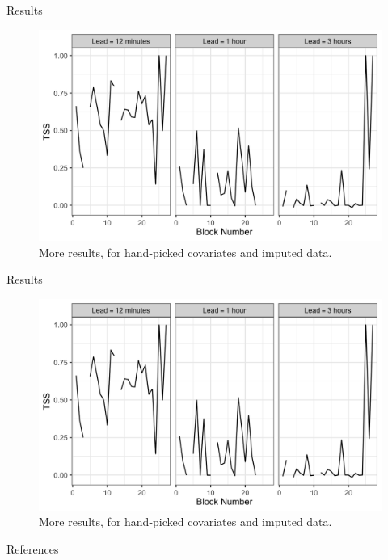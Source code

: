 \documentclass{beamer}
\begin{document}
\begin{frame}{Results}
    \begin{figure}[!htb]
        \centering
        \includegraphics[scale=0.25]{0901_results.png}
        \caption{More results, for hand-picked covariates and imputed data.}
        \label{fig:0901_results}
    \end{figure}
\end{frame}

\begin{frame}{Results}
    \begin{figure}[!htb]
        \centering
        \includegraphics[scale=0.25]{0901_results.png}
        \caption{More results, for hand-picked covariates and imputed data.}
        \label{fig:0901_results}
    \end{figure}
\end{frame}

\begin{frame}[allowframebreaks]{References}
    \nocite{*}
    \printbibliography
\end{frame}
\end{document}
